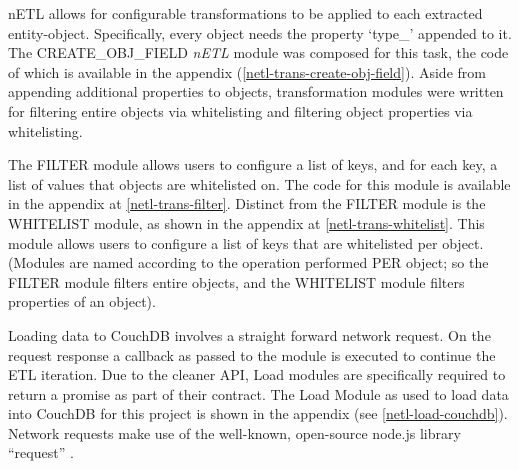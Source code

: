 nETL allows for configurable transformations to be applied to each extracted entity-object. Specifically, every object needs the property `type\_' appended to it. The CREATE\_OBJ\_FIELD \textit{nETL} module was composed for this task, the code of which is available in the appendix (\ref{netl-trans-create-obj-field}). Aside from appending additional properties to objects, transformation modules were written for filtering entire objects via whitelisting and filtering object properties via whitelisting.

The FILTER module allows users to configure a list of keys, and for each key, a list of values that objects are whitelisted on. The code for this module is available in the appendix at \ref{netl-trans-filter}. Distinct from the FILTER module is the WHITELIST module, as shown in the appendix at \ref{netl-trans-whitelist}. This module allows users to configure a list of keys that are whitelisted per object. (Modules are named according to the operation performed PER object; so the FILTER module filters entire objects, and the WHITELIST module filters properties of an object).

Loading data to CouchDB involves a straight forward network request. On the request response a callback as passed to the module is executed to continue the ETL iteration. Due to the cleaner API, Load modules are specifically required to return a promise as part of their contract. The Load Module as used to load data into CouchDB for this project is shown in the appendix (see \ref{netl-load-couchdb}). Network requests make use of the well-known, open-source node.js library ``request'' \cite{request-lib}.